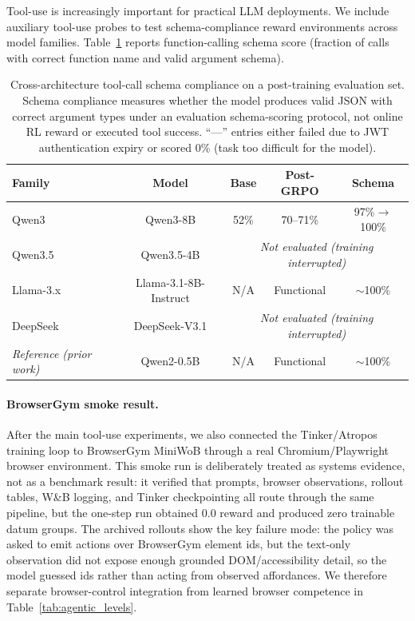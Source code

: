 Tool-use is increasingly important for practical LLM deployments. We include
auxiliary tool-use probes to test schema-compliance reward environments across
model families.
Table~\ref{tab:tool_use_cross_arch} reports function-calling schema score
(fraction of calls with correct function name and valid argument schema).

\begin{table}[htbp]
\centering
\caption{Cross-architecture tool-call schema compliance on a post-training evaluation set. Schema compliance measures whether the model produces valid JSON with correct argument types under an evaluation schema-scoring protocol, not online RL reward or executed tool success. ``---'' entries either failed due to JWT authentication expiry or scored 0\% (task too difficult for the model).}
\label{tab:tool_use_cross_arch}
\small
\begin{tabular}{@{}lcccc@{}}
\toprule
\textbf{Family} & \textbf{Model} & \textbf{Base} & \textbf{Post-GRPO} & \textbf{Schema} \\
\midrule
Qwen3 & Qwen3-8B & 52\% & 70--71\% & 97\%$\to$100\% \\
Qwen3.5 & Qwen3.5-4B & \multicolumn{3}{c}{\textit{Not evaluated (training interrupted)}} \\
Llama-3.x & Llama-3.1-8B-Instruct & N/A & Functional & $\sim$100\% \\
DeepSeek & DeepSeek-V3.1 & \multicolumn{3}{c}{\textit{Not evaluated (training interrupted)}} \\
\midrule
\textit{Reference (prior work)} & Qwen2-0.5B & N/A & Functional & $\sim$100\% \\
\bottomrule
\end{tabular}
\end{table}

\paragraph{BrowserGym smoke result.}
After the main tool-use experiments, we also connected the Tinker/Atropos
training loop to BrowserGym MiniWoB through a real Chromium/Playwright browser
environment.  This smoke run is deliberately treated as systems evidence, not
as a benchmark result: it verified that prompts, browser observations, rollout
tables, W\&B logging, and Tinker checkpointing all route through the same
pipeline, but the one-step run obtained 0.0 reward and produced zero trainable
datum groups.  The archived rollouts show the key failure mode: the policy was
asked to emit actions over BrowserGym element ids, but the text-only
observation did not expose enough grounded DOM/accessibility detail, so the
model guessed ids rather than acting from observed affordances.  We therefore
separate browser-control integration from learned browser competence in
Table~\ref{tab:agentic_levels}.

